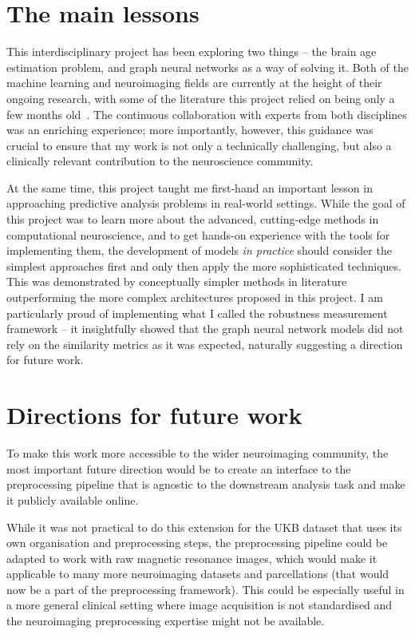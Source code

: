 \section{The main lessons}
This interdisciplinary project has been exploring two things – the brain age estimation problem, and graph neural networks as a way of solving it. Both of the machine learning and neuroimaging fields are currently at the height of their ongoing research, with some of the literature this project relied on being only a few months old~\cite{kaufmann2019, niu2019improved, pervaiz2020optimising}. The continuous collaboration with experts from both disciplines was an enriching experience; more importantly, however, this guidance was crucial to ensure that my work is not only a technically challenging, but also a clinically relevant contribution to the neuroscience community.

At the same time, this project taught me first-hand an important lesson in approaching predictive analysis problems in real-world settings. While the goal of this project was to learn more about the advanced, cutting-edge methods in computational neuroscience, and to get hands-on experience with the tools for implementing them, the development of models \textit{in practice} should consider the simplest approaches first and only then apply the more sophisticated techniques. This was demonstrated by conceptually simpler methods in literature outperforming the more complex architectures proposed in this project. I am particularly proud of implementing what I called the robustness measurement framework – it insightfully showed that the graph neural network models did not rely on the similarity metrics as it was expected, naturally suggesting a direction for future work.

\section{Directions for future work}
To make this work more accessible to the wider neuroimaging community, the most important future direction would be to create an interface to the preprocessing pipeline that is agnostic to the downstream analysis task and make it publicly available online.

While it was not practical to do this extension for the UKB dataset that uses its own organisation and preprocessing steps, the preprocessing pipeline could be adapted to work with raw magnetic resonance images, which would make it applicable to many more neuroimaging datasets and parcellations (that would now be a part of the preprocessing framework). This could be especially useful in a more general clinical setting where image acquisition is not standardised and the neuroimaging preprocessing expertise might not be available. 

